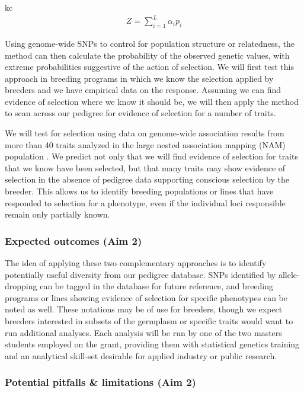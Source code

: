 \documentclass[12pt]{article}
\begin{document}
kc\begin{align}
    Z = \sum_{i=1}^L\alpha_ip_i
	\label{eq:berg}
\end{align}

Using genome-wide SNPs to control for population structure or relatedness, the method can then calculate the probability of the observed genetic values, with extreme probabilities suggestive of the action of selection.
We will first test this approach in breeding programs in which we know the selection applied by breeders and we have empirical data on the response.
Assuming we can find evidence of selection where we know it should be, we will then apply the method to scan across our pedigree for evidence of selection for a number of traits.

We will test for selection using data on genome-wide association results from more than 40 traits analyzed in the large nested association mapping (NAM) population \citep{wallace2014association}.  
We predict not only that we will find evidence of selection for traits that we know have been selected, but that many traits may show evidence of selection in the absence of pedigree data supporting conscious selection by the breeder.
This allows us to identify breeding populations or lines that have responded to selection for a phenotype, even if the individual loci responsible remain only partially known.


\subsubsection*{Expected outcomes (Aim 2)}

The idea of applying these two complementary approaches is to identify potentially useful diversity from our pedigree database.
SNPs identified by allele-dropping can be tagged in the database for future reference, and breeding programs or lines showing evidence of selection for specific phenotypes can be noted as well.
These notations may be of use for breeders, though we expect breeders interested in subsets of the germplasm or specific traits would want to run additional analyses.
Each analysis will be run by one of the two masters students employed on the grant, providing them with statistical genetics training and an analytical skill-set desirable for applied industry or public research. 

\subsubsection*{Potential pitfalls \& limitations (Aim 2)}
\end{document}
